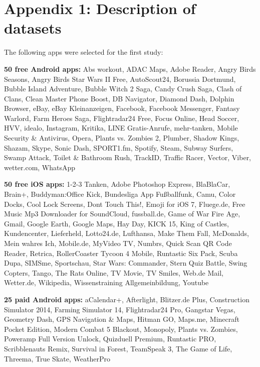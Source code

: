 \documentclass{llncs}
\begin{document}
\appendix

\section*{Appendix 1: Description of datasets}

\noindent The following apps were selected for the first study:

\medskip

\noindent\textbf{50 free Android apps:} Abs workout, ADAC Maps, Adobe Reader, Angry Birds Seasons,
Angry Birds Star Wars II Free, AutoScout24, Borussia Dortmund, Bubble
Island Adventure, Bubble Witch 2 Saga, Candy Crush Saga, Clash of
Clans, Clean Master Phone Boost, DB Navigator, Diamond Dash, Dolphin
Browser, eBay, eBay Kleinanzeigen, Facebook, Facebook Messenger, Fantasy
Warlord, Farm Heroes Saga, Flightradar24 Free, Focus Online, Head
Soccer, HVV, idealo, Instagram, Kritika, LINE Gratis-Anrufe, mehr-tanken,
Mobile Security \& Antivirus, Opera, Plants vs. Zombies 2, Plumber,
Shadow Kings, Shazam, Skype, Sonic Dash, SPORT1.fm, Spotify, Steam,
Subway Surfers, Swamp Attack, Toilet \& Bathroom Rush, TrackID, Traffic
Racer, Vector, Viber, wetter.com, Whats\-App

\medskip

\noindent\textbf{50 free iOS apps:} 1-2-3 Tanken,
Adobe Photoshop Express, BlaBlaCar, Brain+,
Buddyman:Office Kick, Bundesliga App Fußballfunk, Camu, Color Docks,
Cool Lock Screens, Dont Touch This!, Emoji for iOS 7, Fluege.de, Free
Music Mp3 Downloader for SoundCloud, fussball.de, Game of War Fire
Age, Gmail, Google Earth, Google Maps, Hay Day, KICK 15, King of Castles,
Kundencenter, Lieferheld, Lotto24.de, Lufthansa, Make Them Fall, McDonalds,
Mein wahres Ich, Mobile.de, MyVideo TV, Numbrs, Quick Scan QR Code
Reader, Retrica, RollerCoaster Tycoon 4 Mobile, Runtastic Six Pack,
Scuba Dupa, SIMSme, Sportschau, Star Wars: Commander, Stern Quiz Battle,
Swing Copters, Tango, The Rats Online, TV Movie, TV Smiles, Web.de
Mail, Wetter.de, Wikipedia, Wissenstraining Allgemeinbildung, Youtube

\medskip

\noindent\textbf{25 paid Android apps:} aCalendar+, Afterlight, Blitzer.de Plus, Construction Simulator
2014, Farming Simulator 14, Flightradar24 Pro, Gangstar Vegas, Geometry
Dash, GPS Navigation \& Maps, Hitman GO, Maps.me, Minecraft Pocket
Edition, Modern Combat 5 Blackout, Monopoly, Plants vs. Zombies, Poweramp
Full Version Unlock, Quizduell Premium, Runtastic PRO, Scribblenauts
Remix, Survival in Forest, TeamSpeak 3, The Game of Life, Threema,
True Skate, WeatherPro
\end{document}
